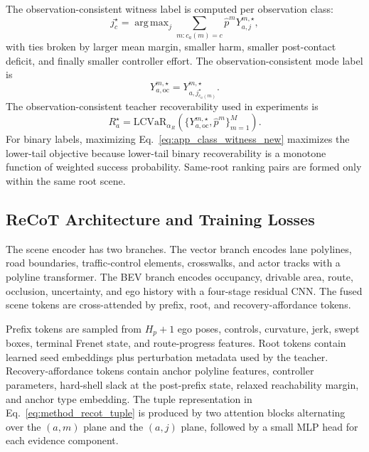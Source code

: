 \documentclass[conference]{IEEEtran}
\DeclareMathOperator*{\argmax}{arg\,max}
\begin{document}
The observation-consistent witness label is computed per observation class:
\begin{equation}
\label{eq:app_class_witness_new}
    j_c^\star=\argmax_j \sum_{m:c_a(m)=c}\hat p^mY_{a,j}^{m,\star},
\end{equation}
with ties broken by larger mean margin, smaller harm, smaller post-contact deficit, and finally smaller controller effort.  The observation-consistent mode label is
\begin{equation}
\label{eq:app_oc_label_new}
    Y_{a,\mathrm{oc}}^{m,\star}=Y_{a,j_{c_a(m)}^\star}^{m,\star}.
\end{equation}
The observation-consistent teacher recoverability used in experiments is
\begin{equation}
\label{eq:app_true_recoverability_new}
    R_a^\star=\mathrm{LCVaR}_{\alpha_R}\left(\{Y_{a,\mathrm{oc}}^{m,\star},\hat p^m\}_{m=1}^{M}\right).
\end{equation}
For binary labels, maximizing Eq.~\eqref{eq:app_class_witness_new} maximizes the lower-tail objective because lower-tail binary recoverability is a monotone function of weighted success probability.  Same-root ranking pairs are formed only within the same root scene.

\subsection{ReCoT Architecture and Training Losses}
\label{app:recot_architecture_new}

The scene encoder has two branches.  The vector branch encodes lane polylines, road boundaries, traffic-control elements, crosswalks, and actor tracks with a polyline transformer.  The BEV branch encodes occupancy, drivable area, route, occlusion, uncertainty, and ego history with a four-stage residual CNN.  The fused scene tokens are cross-attended by prefix, root, and recovery-affordance tokens.

Prefix tokens are sampled from $H_p+1$ ego poses, controls, curvature, jerk, swept boxes, terminal Frenet state, and route-progress features.  Root tokens contain learned seed embeddings plus perturbation metadata used by the teacher.  Recovery-affordance tokens contain anchor polyline features, controller parameters, hard-shell slack at the post-prefix state, relaxed reachability margin, and anchor type embedding.  The tuple representation in Eq.~\eqref{eq:method_recot_tuple} is produced by two attention blocks alternating over the $(a,m)$ plane and the $(a,j)$ plane, followed by a small MLP head for each evidence component.
\end{document}
